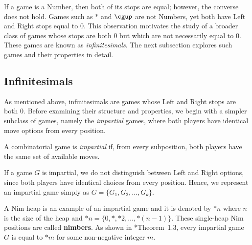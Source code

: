\documentclass[oneside,reqno]{amsart}
\begin{document}


    If a game is a Number, then both of its stops are equal; however, the converse does not hold. Games such as $*$ and $\cgup$ are not Numbers, yet both have Left and Right stops equal to $0$. This observation motivates the study of a broader class of games whose stops are both $0$ but which are not necessarily equal to $0$. These games are known as \emph{infinitesimals}. The next subsection explores such games and their properties in detail.
    
    \subsection{Infinitesimals}\label{subsec: infinitesimals}
    As mentioned above, infinitesimals are games whose Left and Right stops are both $0$. Before examining their structure and properties, we begin with a simpler subclass of games, namely the \emph{impartial} games, where both players have identical move options from every position.
    
    \begin{definition}
        A combinatorial game is \emph{impartial} if, from every subposition, both players have the same set of available moves.
    \end{definition}
    
    If a game $G$ is impartial, we do not distinguish between Left and Right options, since both players have identical choices from every position. 
    Hence, we represent an impartial game simply as $G = \{G_1, G_2, \dots, G_k\}.$

    A {\sc Nim} heap is an example of an impartial game and it is denoted by $*n$ where $n$ is the size of the heap and $*n=\{0,*,*2,\dots,*(n-1)\}$. These single-heap {\sc Nim} positions are called \textbf{nimbers}. As shown in \cite{S2013}*{Theorem~1.3}, every impartial game $G$ is equal to $*m$ for some non-negative integer $m$. 
\end{document}
